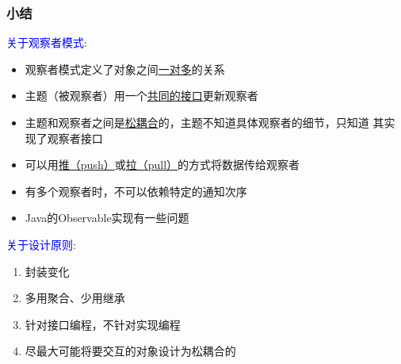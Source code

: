 \documentclass[compress]{beamer}
\begin{document}
\begin{frame}[label=current]
\frametitle{小结}
 {
  \textcolor{blue}{关于观察者模式}:
\begin{itemize}
\item 观察者模式定义了对象之间\uline{一对多}的关系
\item 主题（被观察者）用一个\uline{共同的接口}更新观察者
\item 主题和观察者之间是\uline{松耦合}的，主题不知道具体观察者的细节，只知道
  其实现了观察者接口
\item 可以用\uline{推（push）}或\uline{拉（pull）}的方式将数据传给观察者 
\item 有多个观察者时，不可以依赖特定的通知次序
\item Java的Observable实现有一些问题
\end{itemize}
}

 {
  \textcolor{blue}{关于设计原则}: 
\begin{enumerate}
\item 封装变化
\item 多用聚合、少用继承
\item 针对接口编程，不针对实现编程
\item 尽最大可能将要交互的对象设计为松耦合的
\end{enumerate}
}
\end{frame}
\end{document}
